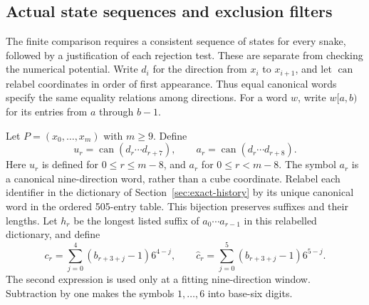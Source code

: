 \subsection{Actual state sequences and exclusion filters}\label{sec:state-filter-bridge}
The finite comparison requires a consistent sequence of states for every
snake, followed by a justification of each rejection test. These are separate
from checking the numerical potential. Write $d_i$ for the direction from
$x_i$ to $x_{i+1}$, and let $\operatorname{can}$ relabel coordinates in order of
first appearance. Thus equal canonical words specify the same equality
relations among directions. For a word $w$, write $w[a,b)$ for its entries
from $a$ through $b-1$.

Let $P=(x_0,\ldots,x_m)$ with $m\ge9$. Define
\[
u_r=\operatorname{can}(d_r\cdots d_{r+7}),\qquad
a_r=\operatorname{can}(d_r\cdots d_{r+8}).
\]
Here $u_r$ is defined for $0\le r\le m-8$, and $a_r$ for $0\le r<m-8$.
The symbol $a_r$ is a canonical nine-direction word, rather than a cube
coordinate. Relabel each identifier in the dictionary of
Section~\ref{sec:exact-history} by its unique canonical word in the ordered
505-entry table. This bijection preserves suffixes and their lengths.
Let $h_r$ be the longest listed suffix of $a_0\cdots a_{r-1}$ in this
relabelled dictionary, and define
\[
c_r=\sum_{j=0}^{4}(b_{r+3+j}-1)6^{4-j},\qquad
\widehat c_r=\sum_{j=0}^{5}(b_{r+3+j}-1)6^{5-j}.
\]
The second expression is used only at a fitting nine-direction window.
Subtraction by one makes the symbols $1,\ldots,6$ into base-six digits.

